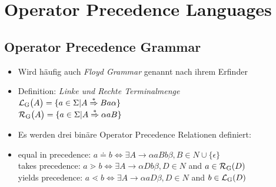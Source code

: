 \documentclass[
10pt,
pantone315, 	%
]{beamer}
\begin{document}
\section{Operator Precedence Languages}
\subsection{Operator Precedence Grammar}
\begin{frame}[t]{\subsecname}
	\begin{itemize}[<+->]
		\item
		Wird häufig auch \textit{Floyd Grammar} genannt nach ihrem Erfinder
		\item
		Definition: \textit{Linke und Rechte Terminalmenge}\\
		$\mathcal{L} \textsubscript{G} \big( A \big) = \{ a \in \Sigma | 
		A \overset{*}{\Rightarrow}Ba \alpha \} $\\
		$\mathcal{R} \textsubscript{G} \big( A \big) = \{ a \in \Sigma | 
		A \overset{*}{\Rightarrow} \alpha aB \}$
		\item
		Es werden drei binäre Operator Precedence Relationen definiert:
		\item
		equal in precedence: $ a \doteq b \Leftrightarrow \exists A \rightarrow \alpha aBb \beta , 
		B \in N \cup \{ \epsilon \}$ \\
		takes precedence: $ a \gtrdot b \Leftrightarrow \exists A \rightarrow \alpha Db \beta , D \in N $ and $ a \in
		\mathcal{R}\textsubscript{G}(D)$ \\
		yields precedence: $ a \lessdot b \Leftrightarrow \exists A \rightarrow \alpha aD \beta , D \in N $ and $ b \in
		\mathcal{L}\textsubscript{G}(D)$
	\end{itemize}
\end{frame}
\end{document}
